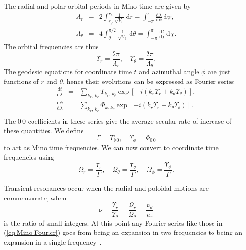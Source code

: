 \documentclass[aps,prd,amsfonts,amssymb,amsmath,nofootinbib,reprint,showpacs]{revtex4-1}
\newcommand{\eqnref}[1]{(\ref{eq:#1})}
\newcommand{\sub}[1]{\ensuremath{_\text{#1}}}
\newcommand{\dd}{\ensuremath{\text{d}}}
\newcommand{\diff}[2]{\ensuremath{\frac{\dd {#1}}{\dd {#2}}}}
\newcommand{\intd}[4]{\ensuremath{\int_{#1}^{#2}{#3}\,\dd{#4}}}
\newcommand{\recip}[1]{\ensuremath{\frac{1}{#1}}}
\begin{document}
The radial and polar orbital periods in Mino time are given by
\begin{subequations}
\begin{eqnarray}
\Lambda_r & = & 2\intd{r\sub{p}}{r\sub{a}}{\recip{\sqrt{V_r}}}{r} = \intd{-\pi}{\pi}{\diff{\lambda}{\psi}}{\psi}, \\
\Lambda_\theta & = & 4\intd{\theta_-}{\pi/2}{\recip{\sqrt{V_\theta}}}{\theta} = \intd{-\pi}{\pi}{\diff{\lambda}{\chi}}{\chi}.
\end{eqnarray}
\end{subequations}
The orbital frequencies are thus
\begin{equation}
\Upsilon_r = \frac{2\pi}{\Lambda_r}, \quad \Upsilon_\theta = \frac{2\pi}{\Lambda_\theta}.
\end{equation}
The geodesic equations for coordinate time $t$ and azimuthal angle $\phi$ are just functions of $r$ and $\theta$, hence their evolutions can be expressed as Fourier series~\cite{Drasco2005}
\begin{subequations}
\begin{eqnarray}
\diff{t}{\lambda} & = & \sum_{k_r,\,k_\theta}T_{k_r,\, k_\theta}\exp\left[-i\left(k_r\Upsilon_r + k_\theta\Upsilon_\theta\right)\right], \\
\diff{\phi}{\lambda} & = & \sum_{k_r,\,k_\theta}\Phi_{k_r\, k_\theta}\exp\left[-i\left(k_r\Upsilon_r + k_\theta\Upsilon_\theta\right)\right]. \\
\label{eq:Mino-Fourier}
\end{eqnarray}
\end{subequations}
The $0\,0$ coefficients in these series give the average secular rate of increase of these quantities. We define
\begin{equation}
\Gamma = T_{0\,0}, \quad \Upsilon_\phi = \Phi_{0\,0}
\end{equation}
to act as Mino time frequencies. We can now convert to coordinate time frequencies using
\begin{equation}
\Omega_r = \frac{\Upsilon_r}{\Gamma}, \quad \Omega_\theta = \frac{\Upsilon_\theta}{\Gamma}, \quad \Omega_\phi = \frac{\Upsilon_\phi}{\Gamma}.
\end{equation}

Transient resonances occur when the radial and poloidal motions are commensurate, when
\begin{equation}
\nu = \frac{\Upsilon_r}{\Upsilon_\theta} = \frac{\Omega_r}{\Omega_\theta} = \frac{n_\theta}{n_r}
\end{equation}
is the ratio of small integers. At this point any Fourier series like those in \eqnref{Mino-Fourier} goes from being an expansion in two frequencies to being an expansion in a single frequency~\cite{Bosley1992}.
\end{document}
